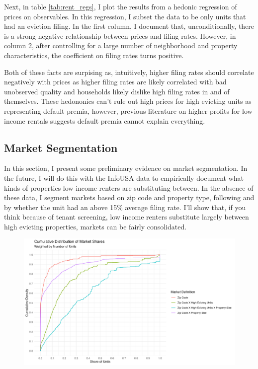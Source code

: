\documentclass{article}
\begin{document}
Next, in table \ref{tab:rent_regs}, I plot the results from a hedonic regression of prices on observables. In this regression, I subset the data to be only units that had an eviction filing. In the first column, I document that, unconditionally, there is a strong negative relationship between prices and filing rates. However, in column 2, after controlling for a large number of neighborhood and property characteristics, the coefficient on filing rates turns positive.

\begin{center}
        
\end{center}

Both of these facts are surpising as, intuitively, higher filing rates should correlate negatively with prices as higher filing rates are likely correlated with bad unobserved quality and households likely dislike high filing rates in and of themselves. These hedononics can't rule out high prices for high evicting units as representing default premia, however, previous literature on higher profits for low income rentals suggests default premia cannot explain everything.

\clearpage

\subsection{Market Segmentation}

In this section, I present some preliminary evidence on market segmentation. In the future, I will do this with the InfoUSA data to empirically document what kinds of properties low income renters are substituting between. In the absence of these data, I segment markets based on zip code and property type, following \parencite{framoutar2024market, calderwang2024algorithmic} and by whether the unit had an above 15\% average filing rate.  I'll show that, if you think because of tenant screening, low income renters substitute largely between high evicting properties, markets can be fairly consolidated.

\begin{figure}[htbp]
        \centering
        \includegraphics[width=1\linewidth]{figs/market_share_cdf.png}
        \label{fig:market-share-cdf}
    \end{figure}
\end{document}
